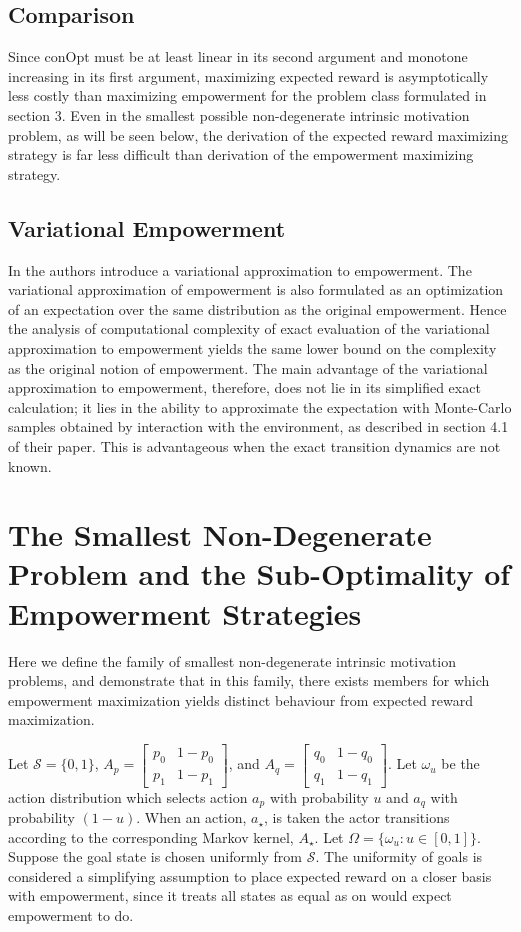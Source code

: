 \documentclass{article}
\newcommand{\Ss}{\mathcal{S}}
\begin{document}
\subsection{Comparison}
Since $\text{conOpt}$ must be at least linear in its second argument and monotone increasing in its first argument, maximizing expected reward is asymptotically less costly than maximizing empowerment for the problem class formulated in section 3.
Even in the smallest possible non-degenerate intrinsic motivation problem, as will be seen below, the derivation of the expected reward maximizing strategy is far less difficult than derivation of the empowerment maximizing strategy. 

\subsection{Variational Empowerment}
In \cite{mohamed2015variational} the authors introduce a variational approximation to empowerment. The variational approximation of empowerment is also formulated as an optimization of an expectation over the same distribution as the original empowerment. Hence the analysis of computational complexity of exact evaluation of the variational approximation to empowerment yields the same lower bound on the complexity as the original notion of empowerment. The main advantage of the variational approximation to empowerment, therefore, does not lie in its simplified exact calculation; it lies in the ability to approximate the expectation with Monte-Carlo samples obtained by interaction with the environment, as described in section 4.1 of their paper. This is advantageous when the exact transition dynamics are not known. 

\section{The Smallest Non-Degenerate Problem and the Sub-Optimality of Empowerment Strategies}
Here we define the family of smallest non-degenerate intrinsic motivation problems, and demonstrate that in this family, there exists members for which empowerment maximization yields distinct behaviour from expected reward maximization.

Let $\Ss=\{0,1\}$, $A_p=\left[\begin{matrix} p_0 & 1-p_0 \\ p_1 & 1-p_1\end{matrix}\right]$, and $A_q=\left[\begin{matrix} q_0 & 1-q_0 \\ q_1 & 1-q_1\end{matrix}\right]$. Let $\omega_u$ be the action distribution which selects action $a_p$ with probability $u$ and $a_q$ with probability $(1-u)$. When an action, $a_\star$, is taken the actor transitions according to the corresponding Markov kernel, $A_\star$. Let $\Omega=\{\omega_u:u\in[0,1]\}$. Suppose the goal state is chosen uniformly from $\Ss$. The uniformity of goals is considered a simplifying assumption to place expected reward on a closer basis with empowerment, since it treats all states as equal as on would expect empowerment to do.
\end{document}
